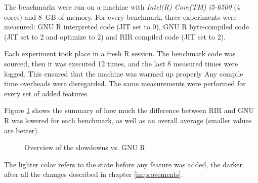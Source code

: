 The benchmarks were run on a machine with \emph{Intel(R) Core(TM) i5-6500} (4 cores) and 8~GB of memory. For every benchmark, three experiments were measured: GNU R interpreted code (JIT set to 0), GNU R byte-compiled code (JIT set to 2 and optimize to 2) and RIR compiled code (JIT set to 2).

Each experiment took place in a fresh R session. The benchmark code was sourced, then it was executed 12 times, and the last 8 measured times were logged. This ensured that the machine was warmed up properly Any compile time overheads were disregarded. The same measurements were performed for every set of added features.

Figure \ref{fig:overall} shows the summary of how much the difference between RIR and GNU R was lowered for each benchmark, as well as an overall average (smaller values are better).

\begin{figure}[htbp]
  \caption{\label{fig:overall}Overview of the slowdowns vs. GNU R}
  \centering
\end{figure}

The lighter color refers to the state before any feature was added, the darker after all the changes described in chapter \ref{improvements}.

